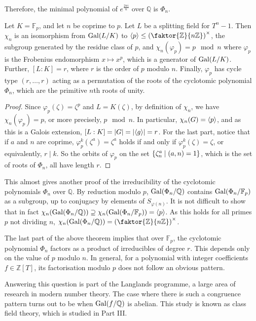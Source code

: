 Therefore, the minimal polynomial of \( e^{\frac{2\pi i}{n}} \) over \( \mathbb Q \) is \( \Phi_n \).
\begin{theorem}
	Let \( K = \mathbb F_p \), and let \( n \) be coprime to \( p \).
	Let \( L \) be a splitting field for \( T^n - 1 \).
	Then \( \chi_n \) is an isomorphism from \( \operatorname{Gal}(L/K) \) to \( \genset{p} \leq \qty(\faktor{\mathbb Z}{n\mathbb Z})^\times \), the subgroup generated by the residue class of \( p \), and \( \chi_n(\varphi_p) = p \mod n \) where \( \varphi_p \) is the Frobenius endomorphism \( x \mapsto x^p \), which is a generator of \( \operatorname{Gal}(L/K) \).
	Further, \( [L:K] = r \), where \( r \) is the order of \( p \) modulo \( n \).
	Finally, \( \varphi_p \) has cycle type \( (r,\dots,r) \) acting as a permutation of the roots of the cyclotomic polynomial \( \Phi_n \), which are the primitive \( n \)th roots of unity.
\end{theorem}
\begin{proof}
	Since \( \varphi_p(\zeta) = \zeta^p \) and \( L = K(\zeta) \), by definition of \( \chi_n \), we have \( \chi_n(\varphi_p) = p \), or more precisely, \( p \mod n \).
	In particular, \( \chi_n(G) = \left\langle{} p \right\rangle \), and as this is a Galois extension, \( [L:K] = \abs{G} = \abs{\left\langle{} g \right\rangle} = r \).
	For the last part, notice that if \( a \) and \( n \) are coprime, \( \varphi_p^k(\zeta^a) = \zeta^a \) holds if and only if \( \varphi_p^k(\zeta) = \zeta \), or equivalently, \( r \mid k \).
	So the orbits of \( \varphi_p \) on the set \( \qty{\zeta_n^a \mid (a,n) = 1} \), which is the set of roots of \( \Phi_n \), all have length \( r \).
\end{proof}
\begin{remark}
	This almost gives another proof of the irreducibility of the cyclotomic polynomials \( \Phi_n \) over \( \mathbb Q \).
	By reduction modulo \( p \), \( \operatorname{Gal}(\Phi_n/\mathbb Q) \) contains \( \operatorname{Gal}(\Phi_n/\mathbb F_p) \) as a subgroup, up to conjugacy by elements of \( S_{\varphi(n)} \).
	It is not difficult to show that in fact \( \chi_n(\operatorname{Gal}(\Phi_n/\mathbb Q)) \supseteq \chi_n(\operatorname{Gal}(\Phi_n/\mathbb F_p)) = \left\langle{} p \right\rangle \).
	As this holds for all primes \( p \) not dividing \( n \), \( \chi_n(\Gal(\Phi_n/\mathbb Q)) = \qty(\faktor{\mathbb Z}{n\mathbb Z})^\times \).
\end{remark}
\begin{remark}
	The last part of the above theorem implies that over \( \mathbb F_p \), the cyclotomic polynomial \( \Phi_n \) factors as a product of irreducibles of degree \( r \).
	This depends only on the value of \( p \) modulo \( n \).
	In general, for a polynomial with integer coefficients \( f \in \mathbb Z[T] \), its factorisation modulo \( p \) does not follow an obvious pattern.

	Answering this question is part of the Langlands programme, a large area of research in modern number theory.
	The case where there is such a congruence pattern turns out to be when \( \operatorname{Gal}(f/\mathbb Q) \) is abelian.
	This study is known as class field theory, which is studied in Part III.
\end{remark}

